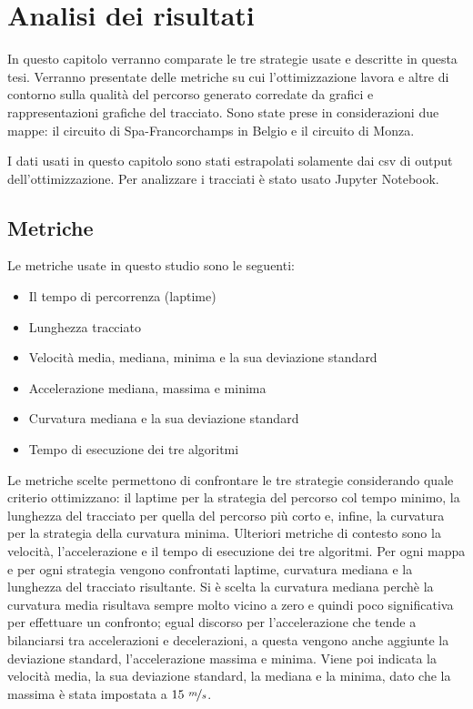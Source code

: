 
\chapter{Analisi dei risultati}
In questo capitolo verranno comparate le tre strategie usate e descritte in questa tesi.
Verranno presentate delle metriche su cui l'ottimizzazione lavora e altre di contorno sulla
qualità del percorso generato corredate da grafici e rappresentazioni grafiche del tracciato.
Sono state prese in considerazioni due mappe: il circuito di Spa-Francorchamps in Belgio e il circuito di
Monza.

I dati usati in questo capitolo sono stati estrapolati solamente dai csv di output dell'ottimizzazione.
Per analizzare i tracciati è stato usato Jupyter Notebook.

\section{Metriche}
Le metriche usate in questo studio sono le seguenti:
\begin{itemize}
	\item Il tempo di percorrenza (laptime)
	\item Lunghezza tracciato 
	\item Velocità media, mediana, minima e la sua deviazione standard
	\item Accelerazione mediana, massima e minima
	\item Curvatura mediana e la sua deviazione standard
	\item Tempo di esecuzione dei tre algoritmi
\end{itemize}
Le metriche scelte permettono di confrontare le tre strategie considerando quale criterio 
ottimizzano: il laptime per la strategia del percorso col tempo minimo, la lunghezza del tracciato per
quella del percorso più corto e, infine, la curvatura per la strategia della curvatura minima.
Ulteriori metriche di contesto sono la velocità, l'accelerazione e il tempo di esecuzione dei tre
algoritmi.
Per ogni mappa e per ogni strategia vengono confrontati laptime, curvatura mediana e la lunghezza del
tracciato risultante. Si è scelta la curvatura mediana perchè la curvatura media risultava sempre molto
vicino a zero e quindi poco significativa per effettuare un confronto; egual discorso per l'accelerazione
che tende a bilanciarsi tra accelerazioni e decelerazioni, a questa vengono anche aggiunte la deviazione
standard, l'accelerazione massima e minima. Viene poi indicata la velocità media, la sua
deviazione standard, la mediana e la minima, dato che la massima è stata impostata a $15\ \nicefrac{m}{s}$.

